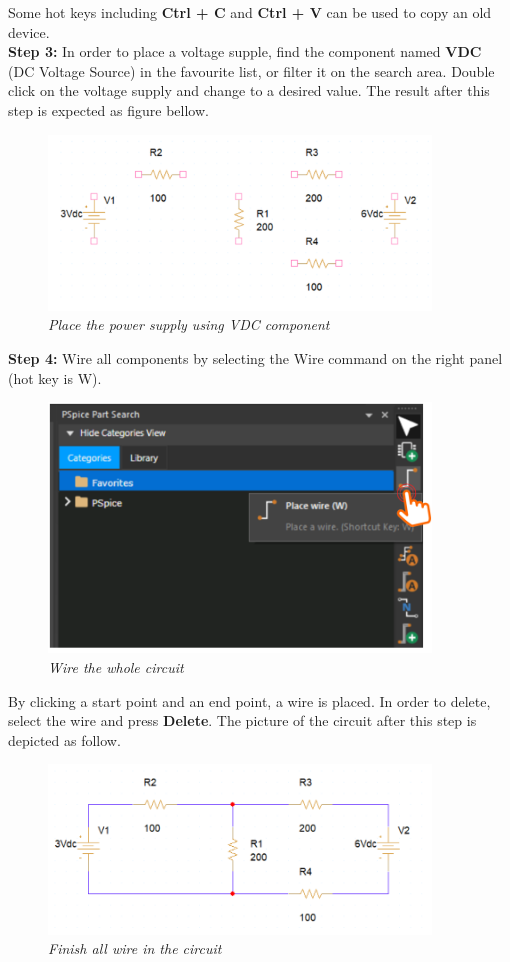 Some hot keys including \textbf{Ctrl + C} and \textbf{Ctrl + V} can be used to copy an old device.\\

\textbf{Step 3: } In order to place a voltage supple, find the component named \textbf{VDC} (DC Voltage Source) in the favourite list, or filter it on the search area. Double click on the voltage supply and change to a desired value. The result after this step is expected as figure bellow.

\begin{figure}[!htp]
    \centering
    \includegraphics[width=4in]{source/picture/bai_1/pic9.PNG}
    \caption{\textit{Place the power supply using VDC component}}
    \label{bai1_pic9}
\end{figure}

\textbf{Step 4: } Wire all components by selecting the Wire command on the right panel (hot key is W).

\begin{figure}[!htp]
    \centering
    \includegraphics[width=4in]{source/picture/bai_1/pic10.PNG}
    \caption{\textit{Wire the whole circuit}}
    \label{bai1_pic10}
\end{figure}

By clicking a start point and an end point, a wire is placed. In order to delete, select the wire and press \textbf{Delete}. The picture of the circuit after this step is depicted as follow.
\newpage
\begin{figure}[!htp]
    \centering
    \includegraphics[width=4in]{source/picture/bai_1/pic12.PNG}
    \caption{\textit{Finish all wire in the circuit}}
    \label{bai1_pic12}
\end{figure}

